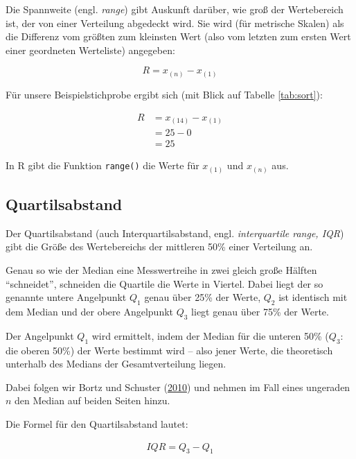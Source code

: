 \documentclass[
  11pt,
  ngerman,
  a4paper,
]{report}
\newenvironment{rtip}{
  \medskip
  \begin{tcolorbox}[colframe=purple,colback=light_gray,title=Softwarehinweis]
}{
  \end{tcolorbox}
  \medskip
}
\begin{document}
Die Spannweite (engl. \emph{range}) gibt Auskunft darüber, wie groß der Wertebereich ist, der von einer Verteilung abgedeckt wird. Sie wird (für metrische Skalen) als die Differenz vom größten zum kleinsten Wert (also vom letzten zum ersten Wert einer geordneten Werteliste) angegeben:

\[
 R=x_{(n)} - x_{(1)}
 \label{eq:range}
\]

Für unsere Beispielstichprobe ergibt sich (mit Blick auf Tabelle \ref{tab:sort}):

\nopagebreak

\[
  \begin{aligned}
     R&=x_{(14)} - x_{(1)} \\[4pt]
     &=25-0 \\[4pt]
     &=25
  \end{aligned}
\]

\begin{rtip}
In R gibt die Funktion \verb|range()| die Werte für $x_{(1)}$ und $x_{(n)}$ aus.
\end{rtip}

\hypertarget{quartilsabstand}{%
\subsection{Quartilsabstand}\label{quartilsabstand}}

Der Quartilsabstand (auch Interquartilsabstand, engl. \emph{interquartile range, IQR}) gibt die Größe des Wertebereichs der mittleren 50\% einer Verteilung an.

Genau so wie der Median eine Messwertreihe in zwei gleich große Hälften \enquote{schneidet}, schneiden die Quartile die Werte in Viertel. Dabei liegt der so genannte untere Angelpunkt \(Q_1\) genau über 25\% der Werte, \(Q_2\) ist identisch mit dem Median und der obere Angelpunkt \(Q_3\) liegt genau über 75\% der Werte.

Der Angelpunkt \(Q_1\) wird ermittelt, indem der Median für die unteren 50\% (\(Q_3\): die oberen 50\%) der Werte bestimmt wird -- also jener Werte, die theoretisch unterhalb des Medians der Gesamtverteilung liegen.

Dabei folgen wir Bortz und Schuster (\protect\hyperlink{ref-bortz}{2010}) und nehmen im Fall eines ungeraden \(n\) den Median auf beiden Seiten hinzu.

Die Formel für den Quartilsabstand lautet:

\[
  \begin{aligned}
    \mathit{IQR}=Q_3-Q_1
  \end{aligned}
  \label{eq:iqr}
\]
\end{document}
